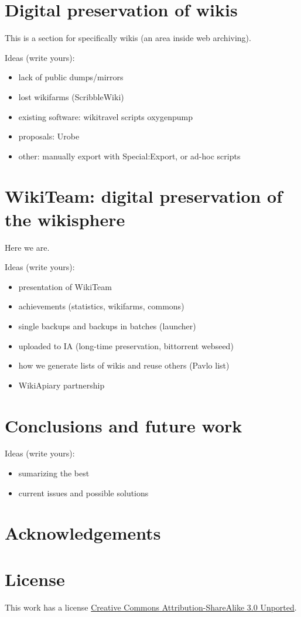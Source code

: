 \documentclass[11pt,twocolumn]{article}
\begin{document}
\section{Digital preservation of wikis}

This is a section for specifically wikis (an area inside web archiving).

Ideas (write yours):
\begin{itemize}
\item lack of public dumps/mirrors
\item lost wikifarms (ScribbleWiki)
\item existing software: wikitravel scripts oxygenpump %
\item proposals: Urobe
\item other: manually export with Special:Export, or ad-hoc scripts
\end{itemize}



\section{WikiTeam: digital preservation of the wikisphere}

Here we are.

Ideas (write yours):
\begin{itemize}
\item presentation of WikiTeam
\item achievements (statistics, wikifarms, commons)
\item single backups and backups in batches (launcher)
\item uploaded to IA (long-time preservation, bittorrent webseed)
\item how we generate lists of wikis and reuse others (Pavlo list)
\item WikiApiary partnership
\end{itemize}


\section{Conclusions and future work}

Ideas (write yours):
\begin{itemize}
\item sumarizing the best 
\item current issues and possible solutions
\end{itemize}


        


\section*{Acknowledgements}


\section*{License}
This work has a license \href{http://creativecommons.org/licenses/by-sa/3.0/}{Creative Commons Attribution-ShareAlike 3.0 Unported}.
\end{document}
